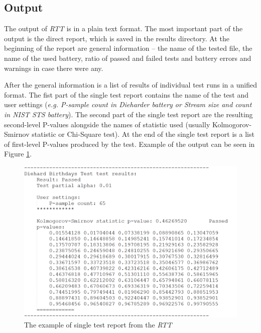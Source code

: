 \documentclass[
  digital,     %
  oneside,     %
  nosansbold,  %
  nocolorbold, %
  nolof,         %
  nolot,         %
]{fithesis4}
\begin{document}
\subsection{Output}
The output of \emph{RTT} is in a plain text format. The most important part of the output is the direct report, which is saved in the results directory. At the beginning of the report are general information -- the name of the tested file, the name of the used battery, ratio of passed and failed tests and battery errors and warnings in case there were any.

After the general information is a list of results of individual test runs in a unified format. The fist part of the single test report contains the name of the test and user settings (\emph{e.g. P-sample count in Dieharder battery or Stream size and count in NIST STS battery}). The second part of the single test report are the resulting second-level P-values alongside the names of statistic used (usually Kolmogorov-Smirnov statistic or Chi-Square test). At the end of the single test report is a list of first-level P-values produced by the test. Example of the output can be seen in Figure \ref{fig:rtt_output_example}.

\begin{figure}
  \begin{center}
    \includegraphics[width=12cm]{figures/rtt_dieharder_output.png}
  \end{center}
  \caption{The example of single test report from the \emph{RTT}}
  \label{fig:rtt_output_example}
\end{figure}
\end{document}
